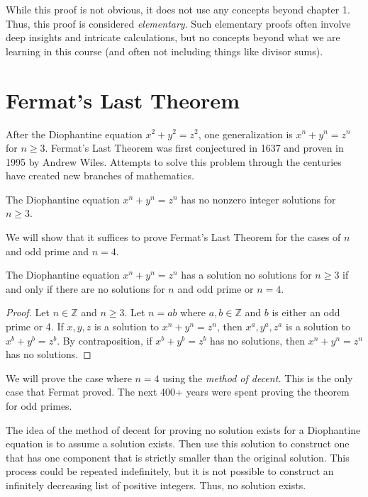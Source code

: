 \documentclass{ximera}
\begin{document}
While this proof is not obvious, it does not use any concepts beyond chapter 1. Thus, this proof is considered \emph{elementary}. Such elementary proofs often involve deep insights and intricate calculations, but no concepts beyond what we are learning in this course (and often not including things like divisor sums).

\section*{Fermat's Last Theorem}
After the Diophantine equation $x^2+y^2=z^2$, one generalization is $x^n+y^n=z^n$ for $n\geq3$. Fermat's Last Theorem was first conjectured in 1637 and proven in 1995 by Andrew Wiles. Attempts to solve this problem through the centuries have created new branches of mathematics.

\begin{theorem}
The Diophantine equation $x^n+y^n=z^n$ has no nonzero integer solutions for $n\geq3$.
\end{theorem}

We will show that it suffices to prove Fermat's Last Theorem for the cases of $n$ and odd prime and $n=4$. 
\begin{theorem}
 The Diophantine equation $x^n+y^n=z^n$ has a solution no solutions for $n\geq 3$ if and only if there are no solutions for $n$ and odd prime or $n=4$.
\end{theorem}
\begin{proof}
 Let $n\in\mathbb{Z}$ and $n\geq 3$. Let $n=ab$ where $a,b\in\mathbb{Z}$ and $b$ is either an odd prime or 4. If $x,y,z$ is a solution to $x^n+y^n=z^n$, then $x^a,y^a,z^a$ is a solution to $x^b+y^b=z^b$. By contraposition, if $x^b+y^b=z^b$ has no solutions, then $x^n+y^n=z^n$ has no solutions.
\end{proof}

We will prove the case where $n=4$ using the \emph{method of decent.} This is the only case that Fermat proved. The next 400+ years were spent proving the theorem for odd primes. 

The idea of the method of decent for proving no solution exists for a Diophantine equation is to assume a solution exists. Then use this solution to construct one that has one component that is strictly smaller than the original solution. This process could be repeated indefinitely, but it is not possible to construct an infinitely decreasing list of positive integers. Thus, no solution exists.
\end{document}
